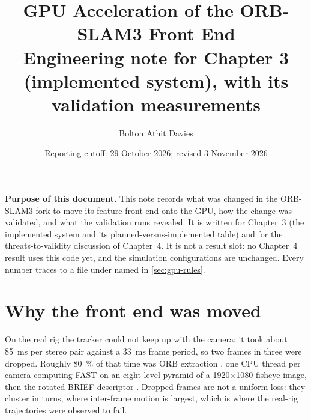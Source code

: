 \documentclass[11pt,a4paper,notitlepage]{report}
\title{GPU Acceleration of the ORB-SLAM3 Front End\\
       \large Engineering note for Chapter 3 (implemented system), with its validation measurements}
\author{Bolton Athit Davies}
\date{Reporting cutoff: 29 October 2026; revised 3 November 2026}
\begin{document}
\maketitle

\noindent\textbf{Purpose of this document.} This note records what was changed
in the ORB-SLAM3 fork to move its feature front end onto the GPU, how the change
was validated, and what the validation runs revealed. It is written for
Chapter~3 (the implemented system and its planned-versus-implemented table) and
for the threats-to-validity discussion of Chapter~4. It is not a result slot:
no Chapter~4 result uses this code yet, and the simulation configurations are
unchanged. Every number traces to a file under 
named in \cref{sec:gpu-rules}.


\section{Why the front end was moved}
\label{sec:gpu-why}

On the real rig the tracker could not keep up with the camera: it took about
\SI{85}{\milli\second} per stereo pair against a \SI{33}{\milli\second} frame
period, so two frames in three were dropped. Roughly \SI{80}{\percent} of that
time was ORB extraction \cite{rublee2011}, one CPU thread per camera computing
FAST \cite{rosten2006} on an eight-level pyramid of a
\num{1920}\(\times\)\num{1080} fisheye image, then the rotated BRIEF
descriptor \cite{calonder2010}. Dropped frames are not a uniform loss: they
cluster in turns, where inter-frame motion is largest, which is where the
real-rig trajectories were observed to fail.
\end{document}
